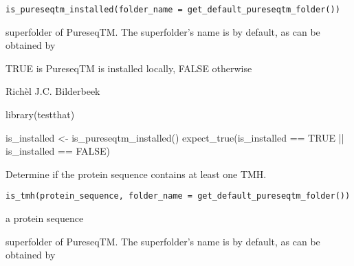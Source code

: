 \documentclass[letterpaper]{book}
\begin{document}
%
\begin{Usage}
\begin{verbatim}
is_pureseqtm_installed(folder_name = get_default_pureseqtm_folder())
\end{verbatim}
\end{Usage}
%
\begin{Arguments}
\begin{ldescription}
\item[\code{folder\_name}] superfolder of PureseqTM.
The superfolder's name is 
by default, as can be obtained by
\end{ldescription}
\end{Arguments}
%
\begin{Value}
TRUE is PureseqTM is installed locally,
FALSE otherwise
\end{Value}
%
\begin{Author}\relax
Richèl J.C. Bilderbeek
\end{Author}
%
\begin{Examples}
\begin{ExampleCode}
library(testthat)

is_installed <- is_pureseqtm_installed()
expect_true(is_installed == TRUE || is_installed == FALSE)
\end{ExampleCode}
\end{Examples}
%
\begin{Description}\relax
Determine if the protein sequence contains at least one TMH.
\end{Description}
%
\begin{Usage}
\begin{verbatim}
is_tmh(protein_sequence, folder_name = get_default_pureseqtm_folder())
\end{verbatim}
\end{Usage}
%
\begin{Arguments}
\begin{ldescription}
\item[\code{protein\_sequence}] a protein sequence

\item[\code{folder\_name}] superfolder of PureseqTM.
The superfolder's name is 
by default, as can be obtained by
\end{ldescription}
\end{Arguments}
\end{document}
